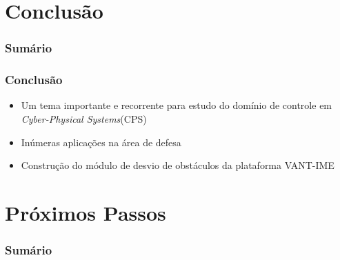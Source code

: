 \documentclass{beamer}
\begin{document}
\section{Conclusão}

\begin{frame}
	\frametitle{Sumário}
	\tableofcontents[currentsection]
\end{frame}

\begin{frame}
	
	\frametitle{Conclusão}
	
	\begin{itemize}	
		
		\item  Um tema importante e recorrente para estudo do domínio de controle em \textit{Cyber-Physical Systems}(CPS) 
		
		
		\item Inúmeras aplicações na área de defesa
		
		\item Construção do módulo de desvio de obstáculos da plataforma VANT-IME 
		
		
	\end{itemize}	
	
	
\end{frame}

\section{Próximos Passos}

\begin{frame}
	\frametitle{Sumário}
	\tableofcontents[currentsection]
\end{frame}
\end{document}
